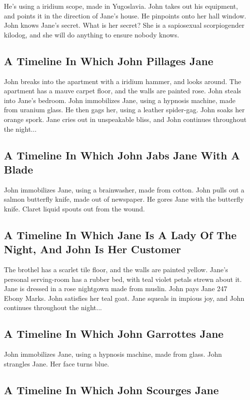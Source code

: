 \documentclass{article}
\begin{document}
He's using a iridium scope, made in Yugoslavia.
John takes out his equipment, and points it in the direction of Jane's house. He pinpoints onto her hall window.
John knows Jane's secret. What is her secret? She is a sapiosexual scorpiogender kilodog, and she will do anything to ensure nobody knows.
\subsection{A Timeline In Which John Pillages Jane}


John breaks into the apartment with a iridium hammer, and looks around.
The apartment has a mauve carpet floor, and the walls are painted rose.
John steals into Jane's bedroom.
John immobilizes Jane, using a hypnosis machine, made from uranium glass.
He then gags her, using a leather spider{-}gag.
John soaks her orange spork.
Jane cries out in unspeakable bliss, and John continues throughout the night...
\subsection{A Timeline In Which John Jabs Jane With A Blade}


John immobilizes Jane, using a brainwasher, made from cotton.
John pulls out a salmon butterfly knife, made out of newspaper.
He gores Jane with the butterfly knife.
Claret liquid spouts out from the wound.
\subsection{A Timeline In Which Jane Is A Lady Of The Night, And John Is Her Customer}


The brothel has a scarlet tile floor, and the walls are painted yellow.
Jane's personal serving{-}room has a rubber bed, with teal violet petals strewn about it.
Jane is dressed in a rose nightgown made from muslin.
John pays Jane 247 Ebony Marks.
John satisfies her teal goat.
Jane squeals in impious joy, and John continues throughout the night...
\subsection{A Timeline In Which John Garrottes Jane}


John immobilizes Jane, using a hypnosis machine, made from glass.
John strangles Jane.
Her face turns blue.
\subsection{A Timeline In Which John Scourges Jane}
\end{document}
